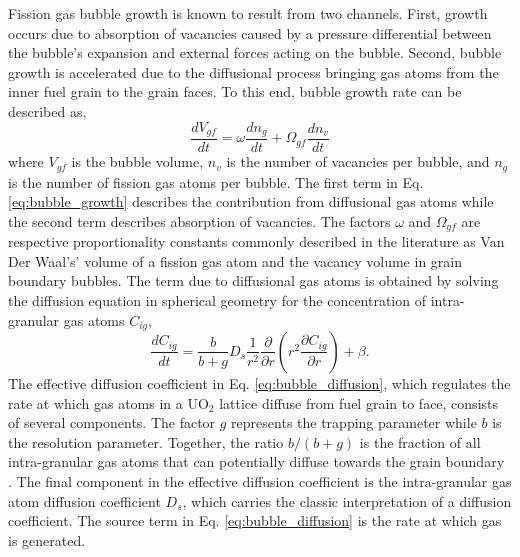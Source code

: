 Fission gas bubble growth is known to result from two channels. First, growth occurs due to absorption of vacancies caused by a pressure differential between the bubble's expansion and external forces acting on the bubble. Second, bubble growth is accelerated due to the diffusional process bringing gas atoms from the inner fuel grain to the grain faces. To this end, bubble growth rate can be described as,
\begin{equation}
\label{eq:bubble_growth}
 \frac{dV_{gf}}{dt} = \omega\frac{dn_g}{dt} + \Omega_{gf}\frac{dn_v}{dt}  
\end{equation}  
where $V_{gf}$ is the bubble volume, $n_v$ is the number of vacancies per bubble, and $n_g$ is the number of fission gas atoms per bubble. The first term in Eq. \ref{eq:bubble_growth} describes the contribution from diffusional gas atoms while the second term describes absorption of vacancies. The factors $\omega$ and $\Omega_{gf}$ are respective proportionality constants commonly described in the literature as Van Der Waal's' volume  of a fission gas atom and the vacancy volume in grain boundary bubbles. The term due to diffusional gas atoms is obtained by solving the diffusion equation in spherical geometry for the concentration of intra-granular gas atoms $C_{ig}$,
\begin{equation}
\label{eq:bubble_diffusion}
 \frac{dC_{ig}}{dt} = \frac{b}{b+g}D_s \frac{1}{r^2} \frac{\partial}{\partial r} \left(r^2 \frac{\partial C_{ig}}{\partial r} \right) +\beta.
\end{equation}
The effective diffusion coefficient in Eq. \ref{eq:bubble_diffusion}, which regulates the rate at which gas atoms in a UO$_2$ lattice diffuse from fuel grain to face, consists of several components. The factor $g$ represents the trapping parameter while $b$ is the resolution parameter. Together, the ratio $b/(b+g)$ is the fraction of all intra-granular gas atoms that can potentially diffuse towards the grain boundary \cite{Pastore3}. The final component in the effective diffusion coefficient is the intra-granular gas atom diffusion coefficient $D_s$, which carries the classic interpretation of a diffusion coefficient. The source term in Eq. \ref{eq:bubble_diffusion} is the rate at which gas is generated. 

